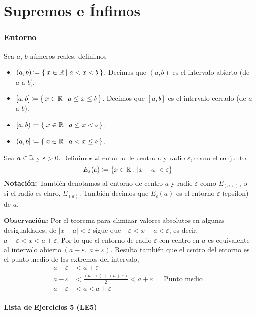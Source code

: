\part*{Supremos e Ínfimos}

\section*{Entorno}

  Sea $a$, $b$ números reales, definimos
\begin{itemize}
 \item $(a,b)\coloneqq \Set{x\in \mathbb{R}| a<x<b}$. Decimos que $(a,b)$ es el intervalo abierto (de $a$ a $b$).
 \item $[a,b]\coloneqq \Set{x\in \mathbb{R}|a\leq x\leq b}$. Decimos que $[a, b]$ es el intervalo cerrado (de $a$ a $b$).
 \item $[a,b)\coloneqq \Set{x\in \mathbb{R}|a\leq x <b}$.
 \item $(a,b]\coloneqq \Set{x\in \mathbb{R}|a<x\leq b}$.
\end{itemize}

 Sea $a \in \mathbb{R}$ y $\varepsilon>0$. Definimos al entorno de centro $a$ y radio $\varepsilon$, como el conjunto: \[E_\varepsilon(a)\coloneqq \{ x\in \mathbb{R}: |x-a|<\varepsilon\}\]
\textbf{Notación:} También denotamos al entorno de centro $a$ y radio $\varepsilon$ como $E_{(a, \varepsilon)}$, o si el radio es claro, $E_{(a)}$. También decimos que $E_\varepsilon(a)$ es el entorno-$\varepsilon$ (epsilon) de $a$.

\textbf{Observación:} Por el teorema para eliminar valores absolutos en algunas desigualdades, de $|x-a| < \varepsilon$ sigue que $-\varepsilon < x - a < \varepsilon$, es decir, $a - \varepsilon < x < a + \varepsilon$. Por lo que el entorno de radio $\varepsilon$ con centro en $a$ es equivalente al intervalo abierto $(a-\varepsilon, \ a+\varepsilon)$. Resulta también que el centro del entorno es el punto medio de los extremos del intervalo,
\begin{align*}
  a - \varepsilon &< a + \varepsilon\\
  a- \varepsilon &< \frac{(a - \varepsilon)+(a + \varepsilon)}{2} < a + \varepsilon && \text{Punto medio}\\
  a- \varepsilon &< a < a + \varepsilon
\end{align*}

\subsection*{Lista de Ejercicios 5 (LE5)}

